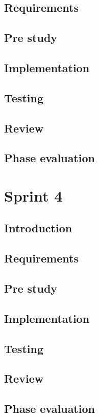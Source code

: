 \documentclass[11pt]{book}
\begin{document}
\subsection{Requirements}
\subsection{Pre study}
\subsection{Implementation}
\subsection{Testing}
\subsection{Review}
\subsection{Phase evaluation}

\section{Sprint 4}
\subsection{Introduction}
\subsection{Requirements}
\subsection{Pre study}
\subsection{Implementation}
\subsection{Testing}
\subsection{Review}
\subsection{Phase evaluation}
\end{document}
